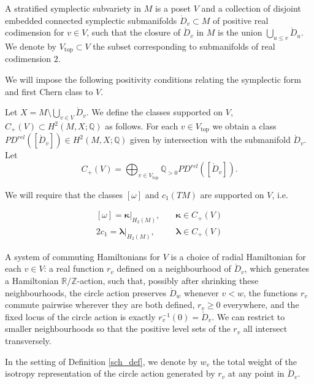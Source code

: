 \documentclass{article}
\numberwithin{equation}{section}
\numberwithin{figure}{section}
\begin{document}
\begin{defn}
A stratified symplectic subvariety in $M$ is a poset $V$ and a collection of disjoint embedded connected symplectic submanifolds $\mathring{D}_v\subset M$ of positive real codimension for $v\in V$, such that the closure of $\mathring{D}_v$ in $M$ is the union $\bigcup_{u\leq v}\mathring{D}_u$. 
We denote by $V_{\operatorname{top}}\subset V$ the subset corresponding to submanifolds of real codimension $2$.
\end{defn}

We will impose the following positivity conditions relating the symplectic form and first Chern class to $V$.
\begin{defn}
Let $X=M\setminus \bigcup_{v\in V}\mathring{D}_v$. We define the classes supported on $V$, $C_+(V)\subset H^2(M,X;\mathbb{Q})$ as follows. For each $v\in V_{\operatorname{top}}$ we obtain a class $PD^{rel}([\mathring{D}_v])\in H^2(M,X;\mathbb{Q})$ given by intersection with the submanifold $\mathring{D}_v$. Let
\begin{equation}
    C_+(V)=\bigoplus_{v\in V_{\operatorname{top}}} \mathbb{Q}_{> 0}PD^{rel}([\mathring{D}_v]).
\end{equation}
\end{defn}
We will require that the classes $[\omega]$ and $c_1(TM)$ are supported on $V$, i.e.
\begin{hyp}
\begin{equation}
\label{positivity}
\begin{split}
[\omega]=\pmb{\kappa}|_{H_2(M)}, \quad & \pmb{\kappa}\in C_+(V)
\\2c_1=\pmb{\lambda}|_{H_2(M)}, \quad & \pmb{\lambda}\in C_+(V)
\end{split}
\end{equation}
\end{hyp}

\begin{defn}
\label{sch_def}
A system of commuting Hamiltonians for $V$ is a choice of radial Hamiltonian for each $v\in V$: a real function $r_v$ defined on a neighbourhood of $\mathring{D}_v$, which generates a Hamiltonian $\mathbb{R}/\mathbb{Z}$-action, such that, possibly after shrinking these neighbourhoods, the circle action preserves $\mathring{D}_w$ whenever $v<w$, the functions $r_v$ commute pairwise wherever they are both defined, $r_v\geq 0$ everywhere, and the fixed locus of the circle action is exactly $r_v^{-1}(0)=\mathring{D}_v$. We can restrict to smaller neighbourhoods so that the positive level sets of the $r_v$ all intersect transversely.
\end{defn}
\begin{defn}
In the setting of Definition \ref{sch_def}, we denote by $w_v$ the total weight of the isotropy representation of the circle action generated by $r_v$ at any point in $\mathring{D}_v$.
\end{defn}
\end{document}
